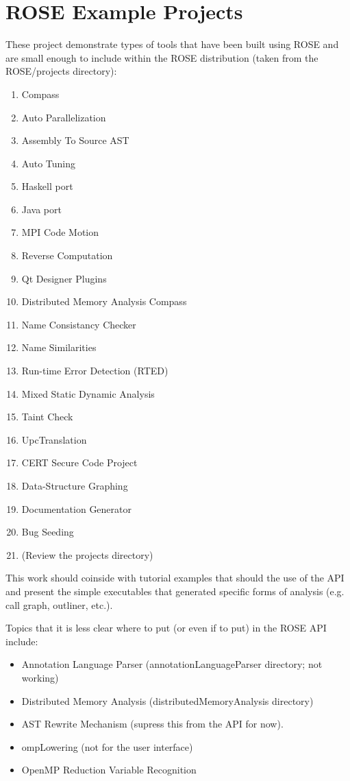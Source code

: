 \section{ROSE Example Projects}
   These project demonstrate types of tools that have been built using ROSE and are 
small enough to include within the ROSE distribution (taken from the ROSE/projects
directory):
\begin{enumerate}
   \item Compass
   \item Auto Parallelization
   \item Assembly To Source AST
   \item Auto Tuning
   \item Haskell port
   \item Java port
   \item MPI Code Motion
   \item Reverse Computation
   \item Qt Designer Plugins
   \item Distributed Memory Analysis Compass
   \item Name Consistancy Checker
   \item Name Similarities
   \item Run-time Error Detection (RTED)
   \item Mixed Static Dynamic Analysis
   \item Taint Check
   \item UpcTranslation
   \item CERT Secure Code Project
   \item Data-Structure Graphing
   \item Documentation Generator
   \item Bug Seeding
   \item (Review the projects directory)
\end{enumerate}

This work should coinside with tutorial examples
that should the use of the API and present the
simple executables that generated specific 
forms of analysis (e.g. call graph, outliner, etc.).

Topics that it is less clear where to put (or even if
to put) in the ROSE API include:
\begin{itemize}
   \item Annotation Language Parser (annotationLanguageParser directory; not working)
   \item Distributed Memory Analysis (distributedMemoryAnalysis directory)
   \item AST Rewrite Mechanism (supress this from the API for now).
   \item ompLowering (not for the user interface)
   \item OpenMP Reduction Variable Recognition
\end{itemize}
